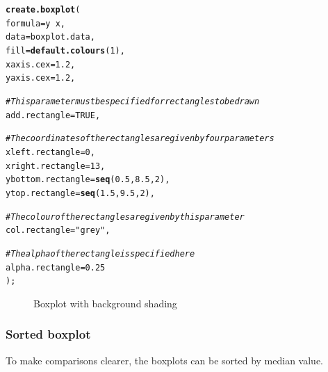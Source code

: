 \documentclass[letterpaper]{article}\usepackage[]{graphicx}\usepackage[]{color}
\makeatletter
\newcommand{\hlnum}[1]{\textcolor[rgb]{0.686,0.059,0.569}{#1}}%
\newcommand{\hlstr}[1]{\textcolor[rgb]{0.192,0.494,0.8}{#1}}%
\newcommand{\hlcom}[1]{\textcolor[rgb]{0.678,0.584,0.686}{\textit{#1}}}%
\newcommand{\hlopt}[1]{\textcolor[rgb]{0,0,0}{#1}}%
\newcommand{\hlstd}[1]{\textcolor[rgb]{0.345,0.345,0.345}{#1}}%
\newcommand{\hlkwc}[1]{\textcolor[rgb]{0.333,0.667,0.333}{#1}}%
\newcommand{\hlkwd}[1]{\textcolor[rgb]{0.737,0.353,0.396}{\textbf{#1}}}%
\newenvironment{kframe}{%
 \def\at@end@of@kframe{}%
 \ifinner\ifhmode%
  \def\at@end@of@kframe{\end{minipage}}%
  \begin{minipage}{\columnwidth}%
 \fi\fi%
 \def\FrameCommand##1{\hskip\@totalleftmargin \hskip-\fboxsep
 \colorbox{shadecolor}{##1}\hskip-\fboxsep
     \hskip-\linewidth \hskip-\@totalleftmargin \hskip\columnwidth}%
 \MakeFramed {\advance\hsize-\width
   \@totalleftmargin\z@ \linewidth\hsize
   \@setminipage}}%
 {\par\unskip\endMakeFramed%
 \at@end@of@kframe}
\newenvironment{knitrout}{}{} %
\makeatother
\begin{document}
\begin{knitrout}
\color{fgcolor}\begin{kframe}
\begin{alltt}
\hlkwd{create.boxplot}\hlstd{(}
    \hlkwc{formula} \hlstd{= y} \hlopt{~} \hlstd{x,}
    \hlkwc{data} \hlstd{= boxplot.data,}
    \hlkwc{fill} \hlstd{=} \hlkwd{default.colours}\hlstd{(}\hlnum{1}\hlstd{),}
    \hlkwc{xaxis.cex} \hlstd{=} \hlnum{1.2}\hlstd{,}
    \hlkwc{yaxis.cex} \hlstd{=} \hlnum{1.2}\hlstd{,}

    \hlcom{# This parameter must be specified for rectangles to be drawn}
    \hlkwc{add.rectangle} \hlstd{=} \hlnum{TRUE}\hlstd{,}

    \hlcom{# The coordinates of the rectangles are given by four parameters}
    \hlkwc{xleft.rectangle} \hlstd{=} \hlnum{0}\hlstd{,}
    \hlkwc{xright.rectangle} \hlstd{=} \hlnum{13}\hlstd{,}
    \hlkwc{ybottom.rectangle} \hlstd{=} \hlkwd{seq}\hlstd{(}\hlnum{0.5}\hlstd{,} \hlnum{8.5}\hlstd{,} \hlnum{2}\hlstd{),}
    \hlkwc{ytop.rectangle} \hlstd{=} \hlkwd{seq}\hlstd{(}\hlnum{1.5}\hlstd{,} \hlnum{9.5}\hlstd{,} \hlnum{2}\hlstd{),}

    \hlcom{# The colour of the rectangles are given by this parameter}
    \hlkwc{col.rectangle} \hlstd{=} \hlstr{"grey"}\hlstd{,}

    \hlcom{# The alpha of the rectangle is specified here}
    \hlkwc{alpha.rectangle} \hlstd{=} \hlnum{0.25}
    \hlstd{);}
\end{alltt}
\end{kframe}\begin{figure}[]


{\centering {} 

}

\caption[Boxplot with background shading]{Boxplot with background shading\label{fig:boxplot3}}
\end{figure}


\end{knitrout}

\subsubsection{Sorted boxplot}
To make comparisons clearer, the boxplots can be sorted by median value.
\end{document}

